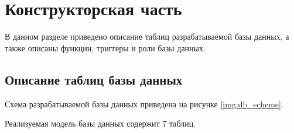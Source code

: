 \chapter{Конструкторская часть}

В данном разделе приведено описание таблиц разрабатываемой базы данных, а также описаны функции, триггеры и роли базы данных.


\section{Описание таблиц базы данных}

Схема разрабатываемой базы данных приведена на рисунке \ref{img:db_scheme}.


Реализуемая модель базы данных содержит 7 таблиц.

